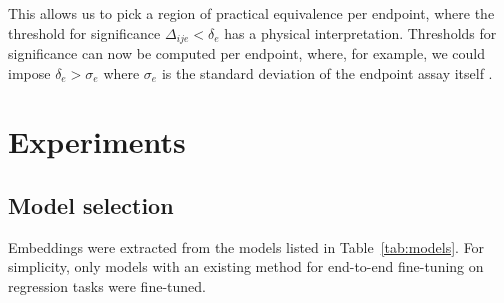 \documentclass{article}
\begin{document}
This allows us to pick a region of practical equivalence per endpoint, where the threshold for significance $\Delta_{ije} < \delta_e$ has a physical interpretation. Thresholds for significance can now be computed per endpoint, where, for example, we could impose $\delta_e > \sigma_e$ where $\sigma_e$ is the standard deviation of the endpoint assay itself \citep{kramer2012, ash2025}.


\section{Experiments}
\subsection{Model selection}
Embeddings were extracted from the models listed in Table~\ref{tab:models}.
For simplicity, only models with an existing method for end-to-end fine-tuning
on regression tasks were fine-tuned.
\end{document}
